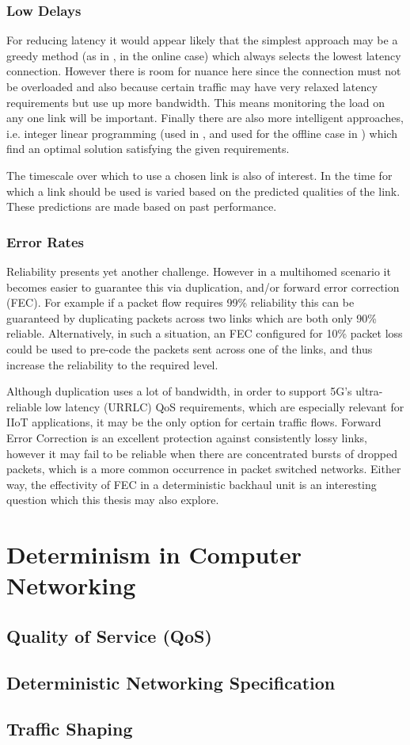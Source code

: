 \subsubsection{Low Delays}

For reducing latency it would appear likely that the simplest approach may be a greedy method (as in \cite{goldenberg2004optimizing}, in the online case) which always selects the lowest latency connection. However there is room for nuance here since the connection must not be overloaded and also because certain traffic may have very relaxed latency requirements but use up more bandwidth. This means monitoring the load on any one link will be important. Finally there are also more intelligent approaches, i.e. integer linear programming (used in \cite{huang2008multiconstrained}, and used for the offline case in \cite{goldenberg2004optimizing}) which find an optimal solution satisfying the given requirements.

The timescale over which to use a chosen link is also of interest. In \cite{habib2007improving} the time for which a link should be used is varied based on the predicted qualities of the link. These predictions are made based on past performance.

\subsubsection{Error Rates}

Reliability presents yet another challenge. However in a multihomed scenario it becomes easier to guarantee this via duplication, and/or forward error correction (FEC). For example if a packet flow requires 99\% reliability this can be guaranteed by duplicating packets across two links which are both only 90\% reliable. Alternatively, in such a situation, an FEC configured for 10\% packet loss could be used to pre-code the packets sent across one of the links, and thus increase the reliability to the required level.

Although duplication uses a lot of bandwidth, in order to support 5G's ultra-reliable low latency (URRLC) QoS requirements, which are especially relevant for IIoT applications, it may be the only option for certain traffic flows. Forward Error Correction is an excellent protection against consistently lossy links, however it may fail to be reliable when there are concentrated bursts of dropped packets, which is a more common occurrence in packet switched networks. Either way, the effectivity of FEC in a deterministic backhaul unit is an interesting question which this thesis may also explore.


\section{Determinism in Computer Networking}

\subsection{Quality of Service (QoS)}

\subsection{Deterministic Networking Specification}

\subsection{Traffic Shaping}

